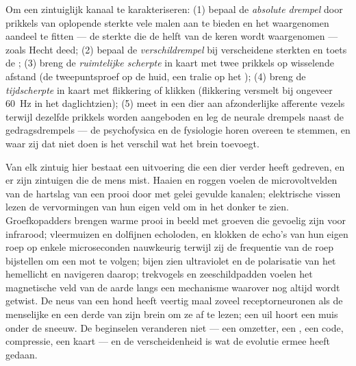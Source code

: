 \begin{method}\label{met:b3:sensory-systems:psychophysics}
Om een zintuiglijk kanaal te karakteriseren: (1) bepaal de
\emph{absolute drempel} door prikkels van oplopende sterkte vele malen
aan te bieden en het waargenomen aandeel te fitten --- de sterkte die
de helft van de keren wordt waargenomen --- zoals Hecht deed;
(2) bepaal de \emph{verschildrempel} bij verscheidene sterkten en toets
de ; (3) breng de \emph{ruimtelijke scherpte} in kaart met
twee prikkels op wisselende afstand (de tweepuntsproef op de huid, een
tralie op het ); (4) breng de \emph{tijdscherpte} in kaart met
flikkering of klikken (flikkering versmelt bij ongeveer \qty{60}{Hz} in
het daglichtzien); (5) meet in een dier aan afzonderlijke afferente
vezels terwijl dezelfde prikkels worden aangeboden en leg de neurale
drempels naast de gedragsdrempels --- de psychofysica en de fysiologie
horen overeen te stemmen, en waar zij dat niet doen is het verschil wat
het brein toevoegt.
\end{method}

\begin{remark}\label{rem:b3:sensory-systems:others}
Van elk zintuig hier bestaat een uitvoering die een dier verder heeft
gedreven, en er zijn zintuigen die de mens mist. Haaien en roggen
voelen de microvoltvelden van de hartslag van een prooi door met gelei
gevulde kanalen; elektrische vissen lezen de vervormingen van hun eigen
veld om in het donker te zien. Groefkopadders brengen warme prooi in
beeld met groeven die gevoelig zijn voor infrarood; vleermuizen en
dolfijnen echoloden, en klokken de echo's van hun eigen roep op enkele
microseconden nauwkeurig terwijl zij de frequentie van de roep
bijstellen om een mot te volgen; bijen zien ultraviolet en de
polarisatie van het hemellicht en navigeren daarop; trekvogels en
zeeschildpadden voelen het magnetische veld van de aarde langs een
mechanisme waarover nog altijd wordt getwist. De neus van een hond
heeft veertig maal zoveel receptorneuronen als de menselijke en een
derde van zijn brein om ze af te lezen; een uil hoort een muis onder de
sneeuw. De beginselen veranderen niet --- een omzetter, een , een code, compressie, een kaart --- en de verscheidenheid is wat
de evolutie ermee heeft gedaan.
\end{remark}

